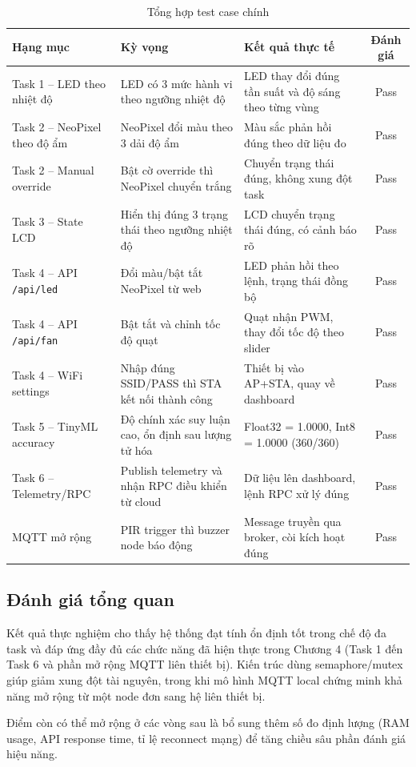 \begin{table}[h!]
\centering
\caption{Tổng hợp test case chính}
\begin{tabular}{|p{3.8cm}|p{4.7cm}|p{4.7cm}|c|}
\hline
\textbf{Hạng mục} & \textbf{Kỳ vọng} & \textbf{Kết quả thực tế} & \textbf{Đánh giá} \\
\hline
Task 1 -- LED theo nhiệt độ & LED có 3 mức hành vi theo ngưỡng nhiệt độ & LED thay đổi đúng tần suất và độ sáng theo từng vùng & Pass \\
\hline
Task 2 -- NeoPixel theo độ ẩm & NeoPixel đổi màu theo 3 dải độ ẩm & Màu sắc phản hồi đúng theo dữ liệu đo & Pass \\
\hline
Task 2 -- Manual override & Bật cờ override thì NeoPixel chuyển trắng & Chuyển trạng thái đúng, không xung đột task & Pass \\
\hline
Task 3 -- State LCD & Hiển thị đúng 3 trạng thái theo ngưỡng nhiệt độ & LCD chuyển trạng thái đúng, có cảnh báo rõ & Pass \\
\hline
Task 4 -- API \texttt{/api/led} & Đổi màu/bật tắt NeoPixel từ web & LED phản hồi theo lệnh, trạng thái đồng bộ & Pass \\
\hline
Task 4 -- API \texttt{/api/fan} & Bật tắt và chỉnh tốc độ quạt & Quạt nhận PWM, thay đổi tốc độ theo slider & Pass \\
\hline
Task 4 -- WiFi settings & Nhập đúng SSID/PASS thì STA kết nối thành công & Thiết bị vào AP+STA, quay về dashboard & Pass \\
\hline
Task 5 -- TinyML accuracy & Độ chính xác suy luận cao, ổn định sau lượng tử hóa & Float32 = 1.0000, Int8 = 1.0000 (360/360) & Pass \\
\hline
Task 6 -- Telemetry/RPC & Publish telemetry và nhận RPC điều khiển từ cloud & Dữ liệu lên dashboard, lệnh RPC xử lý đúng & Pass \\
\hline
MQTT mở rộng & PIR trigger thì buzzer node báo động & Message truyền qua broker, còi kích hoạt đúng & Pass \\
\hline
\end{tabular}
\end{table}

\subsection{Đánh giá tổng quan}

Kết quả thực nghiệm cho thấy hệ thống đạt tính ổn định tốt trong chế độ đa task và đáp ứng đầy đủ các chức năng đã hiện thực trong Chương 4 (Task 1 đến Task 6 và phần mở rộng MQTT liên thiết bị). Kiến trúc dùng semaphore/mutex giúp giảm xung đột tài nguyên, trong khi mô hình MQTT local chứng minh khả năng mở rộng từ một node đơn sang hệ liên thiết bị.

Điểm còn có thể mở rộng ở các vòng sau là bổ sung thêm số đo định lượng (RAM usage, API response time, tỉ lệ reconnect mạng) để tăng chiều sâu phần đánh giá hiệu năng.
